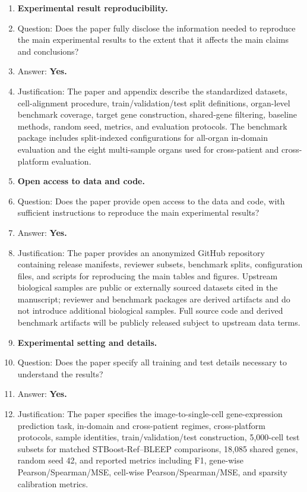 \documentclass{article}
\begin{document}
\begin{enumerate}[leftmargin=*]
\item \textbf{Experimental result reproducibility.}
    \item[] Question: Does the paper fully disclose the information needed to reproduce the main experimental results to the extent that it affects the main claims and conclusions?
    \item[] Answer: \textbf{Yes.}
    \item[] Justification: The paper and appendix describe the standardized datasets, cell-alignment procedure, train/validation/test split definitions, organ-level benchmark coverage, target gene construction, shared-gene filtering, baseline methods, random seed, metrics, and evaluation protocols. The benchmark package includes split-indexed configurations for all-organ in-domain evaluation and the eight multi-sample organs used for cross-patient and cross-platform evaluation.

\item \textbf{Open access to data and code.}
    \item[] Question: Does the paper provide open access to the data and code, with sufficient instructions to reproduce the main experimental results?
    \item[] Answer: \textbf{Yes.}
    \item[] Justification: The paper provides an anonymized GitHub repository containing release manifests, reviewer subsets, benchmark splits, configuration files, and scripts for reproducing the main tables and figures. Upstream biological samples are public or externally sourced datasets cited in the manuscript; reviewer and benchmark packages are derived artifacts and do not introduce additional biological samples. Full source code and derived benchmark artifacts will be publicly released subject to upstream data terms.

\item \textbf{Experimental setting and details.}
    \item[] Question: Does the paper specify all training and test details necessary to understand the results?
    \item[] Answer: \textbf{Yes.}
    \item[] Justification: The paper specifies the image-to-single-cell gene-expression prediction task, in-domain and cross-patient regimes, cross-platform protocols, sample identities, train/validation/test construction, 5{,}000-cell test subsets for matched STBoost-Ref--BLEEP comparisons, 18{,}085 shared genes, random seed 42, and reported metrics including F1, gene-wise Pearson/Spearman/MSE, cell-wise Pearson/Spearman/MSE, and sparsity calibration metrics.


\end{enumerate}
\end{document}
